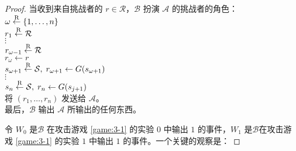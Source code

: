 \begin{proof}
\vspace*{5pt}

\hspace*{5pt} 当收到来自挑战者的 $r\in\mathcal R$，$\mathcal B$ 扮演 $\mathcal A$ 的挑战者的角色：\\
\hspace*{50pt} $\omega\overset{\rm R}\leftarrow\{1,\dots,n\}$\\
\hspace*{50pt} $r_1\overset{\rm R}\leftarrow\mathcal R$\\
\hspace*{74pt} $\vdots$\\
\hspace*{50pt} $r_{\omega-1}\overset{\rm R}\leftarrow\mathcal R$\\
\hspace*{50pt} $r_{\omega}\leftarrow r$\\
\hspace*{50pt} $s_{\omega+1}\overset{\rm R}\leftarrow\mathcal{S},\;r_{\omega+1}\leftarrow G(s_{\omega+1})$\\
\hspace*{74pt} $\vdots$\\
\hspace*{50pt} $s_{n}\overset{\rm R}\leftarrow\mathcal{S},\;r_{n}\leftarrow G(s_{j+1})$\\
\hspace*{50pt} 将 $(r_1,\dots,r_n)$ 发送给 $\mathcal A$。\\
\hspace*{26pt} 最后，$\mathcal B$ 输出 $\mathcal A$ 所输出的任何东西。

\vspace*{5pt}

令 $W_0$ 是$\mathcal B$ 在攻击游戏 \ref{game:3-1} 的实验 $0$ 中输出 $1$ 的事件，$W_1$ 是$\mathcal B$在攻击游戏 \ref{game:3-1} 的实验 $1$ 中输出 $1$ 的事件。一个关键的观察是：


\end{proof}
